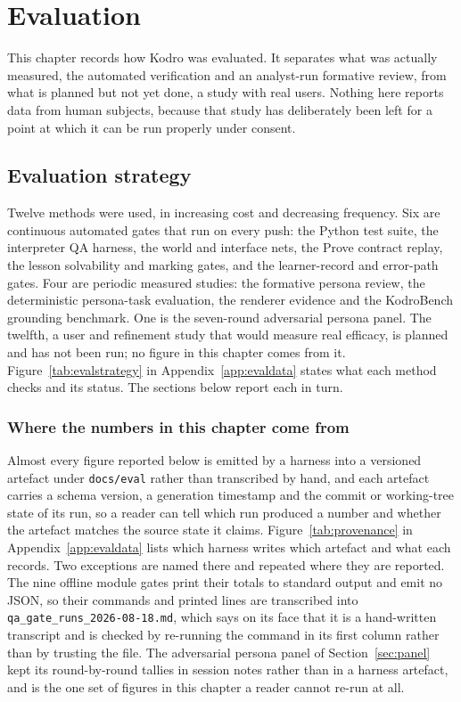 \documentclass[11pt,a4paper]{report}
\begin{document}
\chapter{Evaluation}
\label{ch:evaluation}

This chapter records how Kodro was evaluated. It separates what was actually measured, the automated verification and an analyst-run formative review, from what is planned but not yet done, a study with real users. Nothing here reports data from human subjects, because that study has deliberately been left for a point at which it can be run properly under consent.

\section{Evaluation strategy}
\label{sec:evalstrategy}
Twelve methods were used, in increasing cost and decreasing frequency. Six are continuous automated gates that run on every push: the Python test suite, the interpreter QA harness, the world and interface nets, the Prove contract replay, the lesson solvability and marking gates, and the learner-record and error-path gates. Four are periodic measured studies: the formative persona review, the deterministic persona-task evaluation, the renderer evidence and the KodroBench grounding benchmark. One is the seven-round adversarial persona panel. The twelfth, a user and refinement study that would measure real efficacy, is planned and has not been run; no figure in this chapter comes from it. Figure~\ref{tab:evalstrategy} in Appendix~\ref{app:evaldata} states what each method checks and its status. The sections below report each in turn.

\subsection*{Where the numbers in this chapter come from}
Almost every figure reported below is emitted by a harness into a versioned artefact under \texttt{docs/eval} rather than transcribed by hand, and each artefact carries a schema version, a generation timestamp and the commit or working-tree state of its run, so a reader can tell which run produced a number and whether the artefact matches the source state it claims. Figure~\ref{tab:provenance} in Appendix~\ref{app:evaldata} lists which harness writes which artefact and what each records. Two exceptions are named there and repeated where they are reported. The nine offline module gates print their totals to standard output and emit no JSON, so their commands and printed lines are transcribed into \texttt{qa\_gate\_runs\_2026-08-18.md}, which says on its face that it is a hand-written transcript and is checked by re-running the command in its first column rather than by trusting the file. The adversarial persona panel of Section~\ref{sec:panel} kept its round-by-round tallies in session notes rather than in a harness artefact, and is the one set of figures in this chapter a reader cannot re-run at all.
\end{document}
